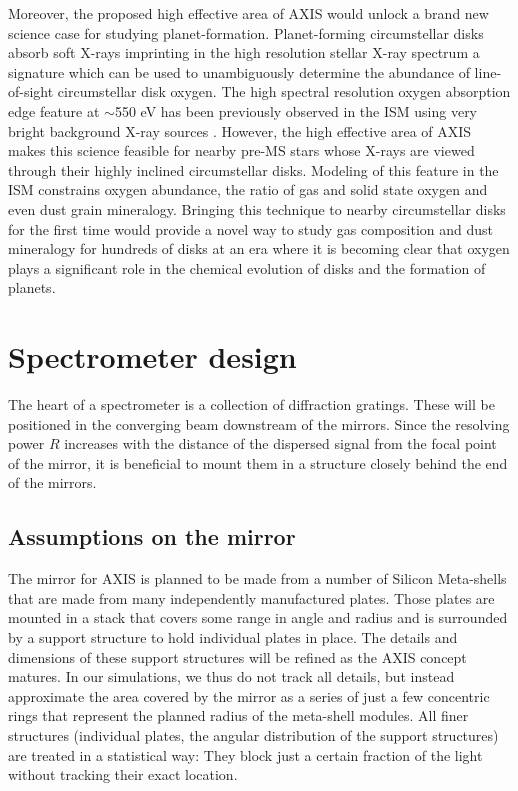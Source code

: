 \documentclass[12pt]{spieman}  %
\begin{document}
\begin{spacing}{1}
Moreover, the proposed high effective area of AXIS would unlock a brand new science case for studying planet-formation. Planet-forming circumstellar disks absorb soft X-rays imprinting in the high resolution stellar X-ray spectrum a signature which can be used to unambiguously determine the abundance of line-of-sight circumstellar disk oxygen. The high spectral resolution oxygen absorption edge feature at $\sim$550 eV has been previously observed in the ISM using very bright background X-ray sources \cite{2012A&A...539A..32C}. However, the high effective area of AXIS makes this science feasible for nearby pre-MS stars whose X-rays are viewed through their highly inclined circumstellar disks.  Modeling of this feature in the ISM constrains oxygen abundance, the ratio of gas and solid state oxygen and even dust grain mineralogy\cite{2000ApJ...542..914W,2013A&A...551A..25P}. Bringing this technique to nearby circumstellar disks for the first time would provide a novel way to study gas composition and dust mineralogy for hundreds of disks at an era where it is becoming clear that oxygen plays a significant role in the chemical evolution of disks and the formation of planets\cite{2015ApJ...804...40G,  2020ApJ...899..134K,2020ApJ...903..124B}.


\section{Spectrometer design}
\label{sect:input}
The heart of a spectrometer is a collection of diffraction gratings. These will be positioned in the converging beam downstream of the mirrors. Since the resolving power $R$ increases with the distance of the dispersed signal from the focal point of the mirror, it is beneficial to mount them in a structure closely behind the end of the mirrors.

\subsection{Assumptions on the mirror}
\label{sect:PSF}
The mirror for AXIS is planned to be made from a number of Silicon Meta-shells that are made from many independently manufactured plates\cite{10.1117/1.JATIS.5.2.021012}. Those plates are mounted in a stack that covers some range in angle and radius and is surrounded by a support structure to hold individual plates in place. The details and dimensions of these support structures will be refined as the AXIS concept matures. In our simulations, we thus do not track all details, but instead approximate the area covered by the mirror as a series of just a few concentric rings that represent the planned radius of the meta-shell modules. All finer structures (individual plates, the angular distribution of the support structures) are treated in a statistical way: They block just a certain fraction of the light without tracking their exact location.


\end{spacing}
\end{document}
